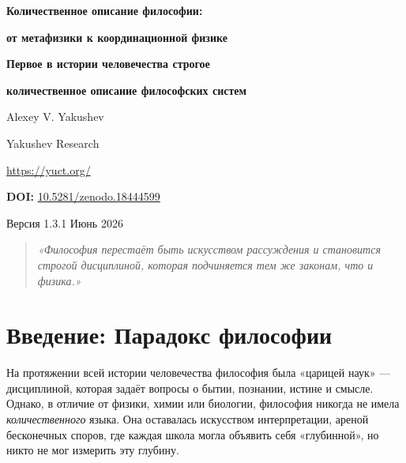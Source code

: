 \documentclass[12pt,a4paper]{article}
\begin{document}
	
	\begin{titlepage}
		\begin{center}
			\vspace*{1cm}
			{\Huge\bfseries\color{darkblue} Количественное описание философии: \par}
			\vspace{0.3cm}
			{\Huge\bfseries\color{darkblue} от метафизики к координационной физике\par}
			\vspace{1cm}
			{\Large\bfseries Первое в истории человечества строгое \par}
			{\Large\bfseries количественное описание философских систем\par}
			\vspace{1.5cm}
			{\large Alexey V. Yakushev\par}
			{\large Yakushev Research\par}
			{\large \url{https://yuct.org/}\par}
			\vspace{1cm}
			{\large \textbf{DOI:} \href{https://doi.org/10.5281/zenodo.18444599}{10.5281/zenodo.18444599}\par}
			\vspace{1cm}
			{\large Версия 1.3.1 \quad Июнь 2026\par}
			\vfill
			\begin{quote}
				\itshape
				«Философия перестаёт быть искусством рассуждения и становится строгой дисциплиной,
				которая подчиняется тем же законам, что и физика.»
			\end{quote}
		\end{center}
	\end{titlepage}
	
	\tableofcontents
	\newpage
	
	\section{Введение: Парадокс философии}
	
	На протяжении всей истории человечества философия была «царицей наук» — дисциплиной, которая задаёт вопросы о бытии, познании, истине и смысле. Однако, в отличие от физики, химии или биологии, философия никогда не имела \emph{количественного} языка. Она оставалась искусством интерпретации, ареной бесконечных споров, где каждая школа могла объявить себя «глубинной», но никто не мог измерить эту глубину.
	
\end{document}
